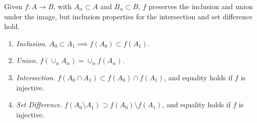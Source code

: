   \begin{theorem}
    Given $f: A \rightarrow B$, with $A_\alpha \subset A$ and $B_\alpha \subset B$, $f$ preserves the inclusion and union under the image, but inclusion properties for the intersection and set difference hold. 
    \begin{enumerate}
      \item \textit{Inclusion}. $A_0 \subset A_1 \implies f(A_0) \subset f(A_1)$. 
      \item \textit{Union}. $f(\cup_\alpha A_\alpha) = \cup_\alpha f(A_\alpha)$. 
      \item \textit{Intersection}. $f(A_0 \cap A_1) \subset f(A_0) \cap f (A_1)$, and equality holds if $f$ is injective. 
      \item \textit{Set Difference}. $f(A_0 \setminus A_1) \supset f(A_0) \setminus f(A_1)$, and equality holds if $f$ is injective. 
    \end{enumerate}
  \end{theorem} 
